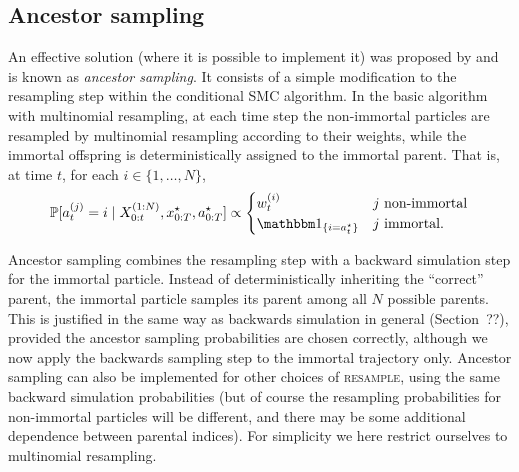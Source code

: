 \subsection{Ancestor sampling}\label{sec:ancsamp}
An effective solution (where it is possible to implement it) was proposed by \textcite{whiteley2010} and is known as \emph{ancestor sampling}.
It consists of a simple modification to the resampling step within the conditional SMC algorithm. 
In the basic algorithm with multinomial resampling, at each time step the non-immortal particles are resampled by multinomial resampling according to their weights, while the immortal offspring is deterministically assigned to the immortal parent. That is, at time $t$, for each $i \in \{1,\dots, N\}$,
\begin{equation*}
\Prob[a_t^{(j)} = i \mid X_{0:t}^{(1:N)}, x_{0:T}^\star, a_{0:T}^\star ] 
\propto \begin{cases}
w_t^{(i)} & j \text{ non-immortal} \\
\I{i = a_t^\star} & j \text{ immortal} .
\end{cases}
\end{equation*}

Ancestor sampling combines the resampling step with a backward simulation step for the immortal particle. Instead of deterministically inheriting the ``correct'' parent, the immortal particle samples its parent among all $N$ possible parents.
This is justified in the same way as backwards simulation in general (Section~??), provided the ancestor sampling probabilities are chosen correctly, although we now apply the backwards sampling step to the immortal trajectory only.
Ancestor sampling can also be implemented for other choices of \textsc{resample}, using the same backward simulation probabilities (but of course the resampling probabilities for non-immortal particles will be different, and there may be some additional dependence between parental indices). For simplicity we here restrict ourselves to multinomial resampling.

